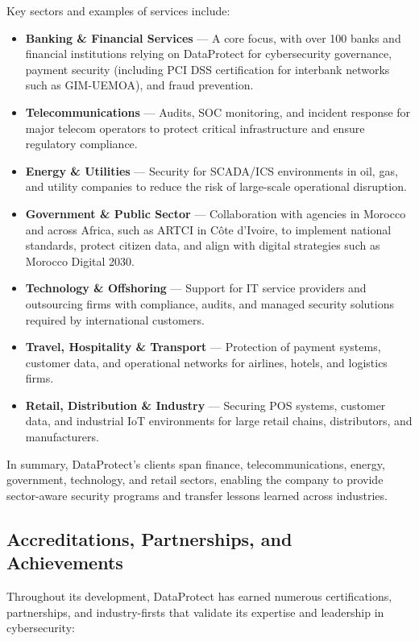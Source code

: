 \documentclass[12pt]{article}
\begin{document}
Key sectors and examples of services include:

\begin{itemize}
    \item \textbf{Banking \& Financial Services} --- A core focus, with over 100 banks and financial institutions relying on DataProtect for cybersecurity governance, payment security (including PCI DSS certification for interbank networks such as GIM-UEMOA), and fraud prevention.
    \item \textbf{Telecommunications} --- Audits, SOC monitoring, and incident response for major telecom operators to protect critical infrastructure and ensure regulatory compliance.
    \item \textbf{Energy \& Utilities} --- Security for SCADA/ICS environments in oil, gas, and utility companies to reduce the risk of large-scale operational disruption.
    \item \textbf{Government \& Public Sector} --- Collaboration with agencies in Morocco and across Africa, such as ARTCI in C\^ote d'Ivoire, to implement national standards, protect citizen data, and align with digital strategies such as Morocco Digital 2030.
    \item \textbf{Technology \& Offshoring} --- Support for IT service providers and outsourcing firms with compliance, audits, and managed security solutions required by international customers.
    \item \textbf{Travel, Hospitality \& Transport} --- Protection of payment systems, customer data, and operational networks for airlines, hotels, and logistics firms.
    \item \textbf{Retail, Distribution \& Industry} --- Securing POS systems, customer data, and industrial IoT environments for large retail chains, distributors, and manufacturers.
\end{itemize}

In summary, DataProtect's clients span finance, telecommunications, energy,
government, technology, and retail sectors, enabling the company to provide
sector-aware security programs and transfer lessons learned across industries.

\subsection{Accreditations, Partnerships, and Achievements}

Throughout its development, DataProtect has earned numerous certifications,
partnerships, and industry-firsts that validate its expertise and leadership in
cybersecurity:
\end{document}
